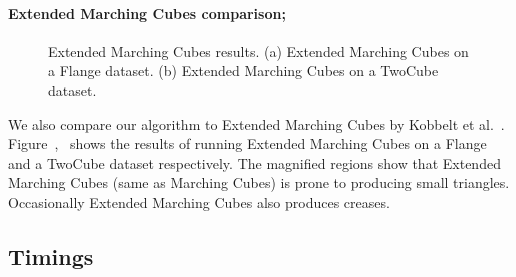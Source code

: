 \paragraph{Extended Marching Cubes comparison;}
\begin{figure}[tb]
	\centering
	\caption{Extended Marching Cubes results. (a) Extended Marching Cubes on a Flange dataset. (b) Extended Marching Cubes on a TwoCube dataset.}	
\end{figure}
We also compare our algorithm to Extended Marching Cubes by Kobbelt et al.~\cite{kbsh-fssev-01}. Figure~\protect{},~\protect{} shows the results of running Extended Marching Cubes on a Flange and a TwoCube dataset respectively. The magnified regions show that Extended Marching Cubes (same as Marching Cubes) is prone to producing small triangles. Occasionally Extended Marching Cubes also produces creases. 
\subsection{Timings}

